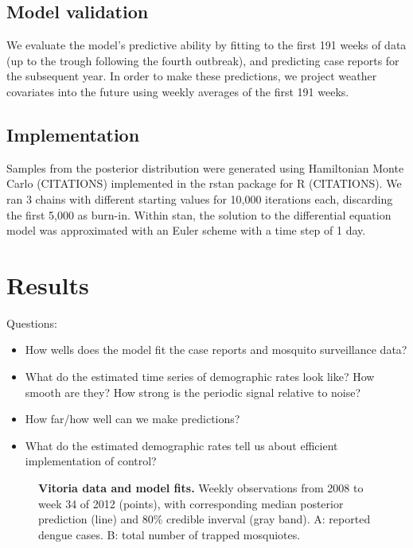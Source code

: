 \documentclass[10pt,letterpaper]{article}
\begin{document}
\subsection*{Model validation}

We evaluate the model's predictive ability by fitting to the first 191 weeks of data (up to the trough following the fourth outbreak), and predicting case reports for the subsequent year.
In order to make these predictions, we project weather covariates into the future using weekly averages of the first 191 weeks.

\subsection*{Implementation}
 
Samples from the posterior distribution were generated using Hamiltonian Monte Carlo (CITATIONS) implemented in the rstan package for R (CITATIONS). 
We ran 3 chains with different starting values for 10,000 iterations each, discarding the first 5,000 as burn-in.
Within stan, the solution to the differential equation model was approximated with an Euler scheme with a time step of 1 day.  

\section*{Results}

Questions:
\begin{itemize}
\item How wells does the model fit the case reports and mosquito surveillance data?
\item What do the estimated time series of demographic rates look like? How smooth are they? How strong is the periodic signal relative to noise?
\item How far/how well can we make predictions?
\item What do the estimated demographic rates tell us about efficient implementation of control?
\end{itemize}


\begin{figure}[!h]
\caption{{\bf Vitoria data and model fits.}
Weekly observations from 2008 to week 34 of 2012 (points), with corresponding median posterior prediction (line) and 80\% credible inverval (gray band). A: reported dengue cases. B: total number of trapped mosquiotes.
}
\label{timeseries}
\end{figure}
\end{document}

